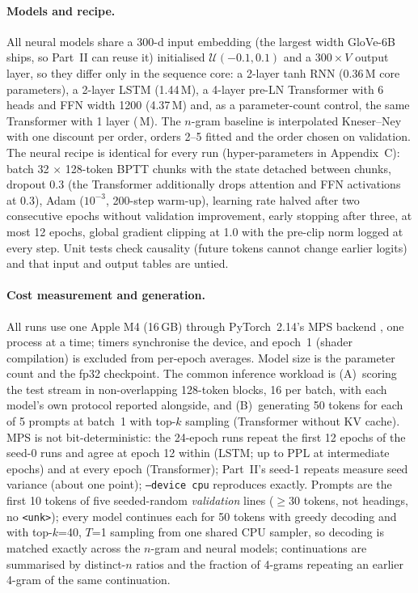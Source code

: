 \documentclass[10pt,a4paper]{article}
\begin{document}
\paragraph{Models and recipe.} All neural models share a $300$-d input embedding (the largest width GloVe-6B ships, so Part~II can reuse it) initialised $\mathcal{U}(-0.1,0.1)$ and a $300\!\times\!V$ output layer, so they differ only in the sequence core: a 2-layer tanh RNN (0.36\,M core parameters), a 2-layer LSTM \citep{hochreiter1997long} (1.44\,M), a 4-layer pre-LN Transformer \citep{vaswani2017attention} with 6 heads and FFN width 1200 (4.37\,M) and, as a parameter-count control, the same Transformer with 1 layer (\coreMTransformerOne\,M). The $n$-gram baseline is interpolated Kneser--Ney \citep{kneser1995improved,chen1998empirical} with one discount per order, orders 2--5 fitted and the order chosen on validation. The neural recipe is identical for every run (hyper-parameters in Appendix~C): batch 32 $\times$ 128-token BPTT chunks with the state detached between chunks, dropout 0.3 (the Transformer additionally drops attention and FFN activations at 0.3), Adam ($10^{-3}$, 200-step warm-up), learning rate halved after two consecutive epochs without validation improvement, early stopping after three, at most 12 epochs, global gradient clipping at 1.0 with the pre-clip norm logged at every step. Unit tests check causality (future tokens cannot change earlier logits) and that input and output tables are untied.

\paragraph{Cost measurement and generation.} All runs use one Apple M4 (16\,GB) through PyTorch~2.14's MPS backend \citep{paszke2019pytorch}, one process at a time; timers synchronise the device, and epoch~1 (shader compilation) is excluded from per-epoch averages. Model size is the parameter count and the fp32 checkpoint. The common inference workload is (A)~scoring the test stream in non-overlapping 128-token blocks, 16 per batch, with each model's own protocol reported alongside, and (B)~generating 50 tokens for each of 5 prompts at batch~1 with top-$k$ sampling (Transformer without KV cache). MPS is not bit-deterministic: the 24-epoch runs repeat the first 12 epochs of the seed-0 runs and agree at epoch 12 within \mpsRepeatDiffLSTM{} (LSTM; up to \mpsRepeatMaxDiffLSTM{} PPL at intermediate epochs) and \mpsRepeatDiffTransformer{} at every epoch (Transformer); Part~II's seed-1 repeats measure seed variance (about one point); \texttt{--device cpu} reproduces exactly. Prompts are the first 10 tokens of five seeded-random \emph{validation} lines ($\ge$30 tokens, not headings, no \texttt{<unk>}); every model continues each for 50 tokens with greedy decoding and with top-$k$=40, $T$=1 sampling from one shared CPU sampler, so decoding is matched exactly across the $n$-gram and neural models; continuations are summarised by distinct-$n$ ratios and the fraction of 4-grams repeating an earlier 4-gram of the same continuation.
\end{document}
